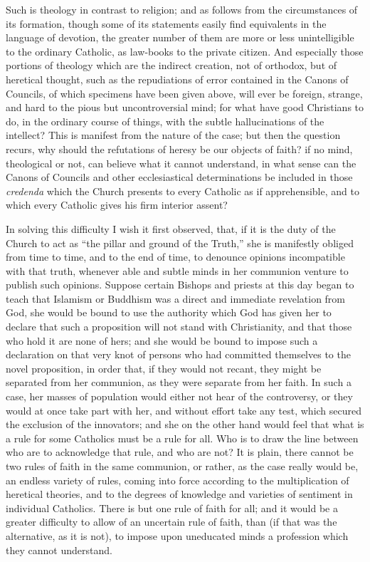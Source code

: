 Such is theology in contrast to religion; and as follows from the
circumstances of its formation, though some of its statements easily
find equivalents in the language of devotion, the greater number of
them are more or less unintelligible to the ordinary Catholic, as
law-books to the private citizen. And especially those portions of
theology which are the indirect creation, not of orthodox, but of
heretical thought, such as the repudiations of error contained in the
Canons of Councils, of which specimens have been given above, will
ever be foreign, strange, and hard to the pious but uncontroversial
mind; for what have good Christians to do, in the ordinary
course of things, with the subtle hallucinations of the intellect?
This is manifest from the nature of the case; but then the question
recurs, why should the refutations of heresy be our objects of faith?
if no mind, theological or not, can believe what it cannot understand,
in what sense can the Canons of Councils and other ecclesiastical
determinations be included in those \emph{credenda} which the Church
presents to every Catholic as if apprehensible, and to which every
Catholic gives his firm interior assent?

In solving this difficulty I wish it first observed, that, if it is
the duty of the Church to act as ``the pillar and ground of the
Truth,'' she is manifestly obliged from time to time, and to the
end of time, to denounce opinions incompatible with that truth,
whenever able and subtle minds in her communion venture to publish
such opinions. Suppose certain Bishops and priests at this day began
to teach that Islamism or Buddhism was a direct and immediate
revelation from God, she would be bound to use the authority which God
has given her to declare that such a proposition will not stand with
Christianity, and that those who hold it are none of hers; and she
would be bound to impose such a declaration on that very knot of
persons who had committed themselves to the novel proposition, in
order that, if they would not recant, they might be separated from her
communion, as they were separate from her faith. In such a case, her
masses of population would either not hear of the controversy, or they
would at once take part with her, and without effort take any test,
which secured the exclusion of the innovators; and she on the
other hand would feel that what is a rule for some Catholics must be a
rule for all. Who is to draw the line between who are to acknowledge
that rule, and who are not? It is plain, there cannot be two rules of
faith in the same communion, or rather, as the case really would be,
an endless variety of rules, coming into force according to the
multiplication of heretical theories, and to the degrees of knowledge
and varieties of sentiment in individual Catholics. There is but one
rule of faith for all; and it would be a greater difficulty to allow
of an uncertain rule of faith, than (if that was the alternative, as
it is not), to impose upon uneducated minds a profession which they
cannot understand.

